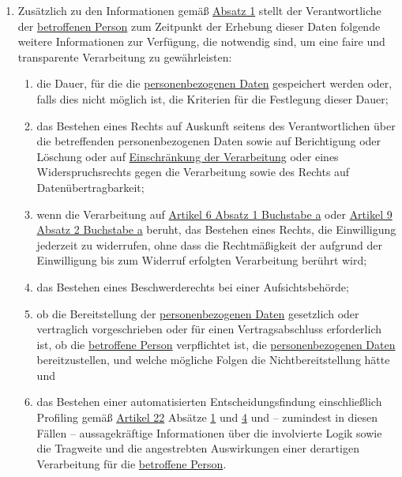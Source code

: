 \begin{enumerate}
\begin{enumerate}
  \end{enumerate}

  \item Zusätzlich zu den Informationen gemäß \hyperref[itm:13-1]{Absatz 1} stellt der Verantwortliche der \hyperref[itm:04-1]{betroffenen
   Person} zum Zeitpunkt der Erhebung dieser Daten folgende weitere Informationen zur Verfügung, die notwendig sind, um
   eine faire und transparente Verarbeitung zu gewährleisten:
  \label{itm:13-2}

  \begin{enumerate}
  
    \item die Dauer, für die die \hyperref[itm:04-1]{personenbezogenen Daten} gespeichert werden oder, falls dies nicht möglich ist, die
     Kriterien für die Festlegung dieser Dauer;
    \label{itm:13-2a}

    \item das Bestehen eines Rechts auf Auskunft seitens des Verantwortlichen über die betreffenden personenbezogenen
     Daten sowie auf Berichtigung oder Löschung oder auf \hyperref[itm:04-3]{Einschränkung der Verarbeitung} oder eines Widerspruchsrechts
     gegen die Verarbeitung sowie des Rechts auf Datenübertragbarkeit;
    \label{itm:13-2b}

    \item wenn die Verarbeitung auf \hyperref[itm:06-1a]{Artikel 6 Absatz 1 Buchstabe a} oder \hyperref[itm:09-2a]
     {Artikel 9 Absatz 2 Buchstabe a} beruht, das Bestehen eines Rechts, die Einwilligung jederzeit zu widerrufen, ohne
     dass die Rechtmäßigkeit der aufgrund der Einwilligung bis zum Widerruf erfolgten Verarbeitung berührt wird;
    \label{itm:13-2c}

    \item das Bestehen eines Beschwerderechts bei einer Aufsichtsbehörde;
    \label{itm:13-2d}

    \item ob die Bereitstellung der \hyperref[itm:04-1]{personenbezogenen Daten} gesetzlich oder vertraglich vorgeschrieben oder für einen
     Vertragsabschluss erforderlich ist, ob die \hyperref[itm:04-1]{betroffene Person} verpflichtet ist, die \hyperref[itm:04-1]{personenbezogenen Daten}
     bereitzustellen, und welche mögliche Folgen die Nichtbereitstellung hätte und
    \label{itm:13-2e}

    \item das Bestehen einer automatisierten Entscheidungsfindung einschließlich Profiling gemäß \hyperref[ch:22]
     {Artikel 22} Absätze \hyperref[itm:22-1]{1} und \hyperref[itm:22-4]{4} und -- zumindest in diesen Fällen --
     aussagekräftige Informationen über die involvierte Logik sowie die Tragweite und die angestrebten Auswirkungen
     einer derartigen Verarbeitung für die \hyperref[itm:04-1]{betroffene Person}.
    \label{itm:13-2f}


\end{enumerate}
\end{enumerate}

